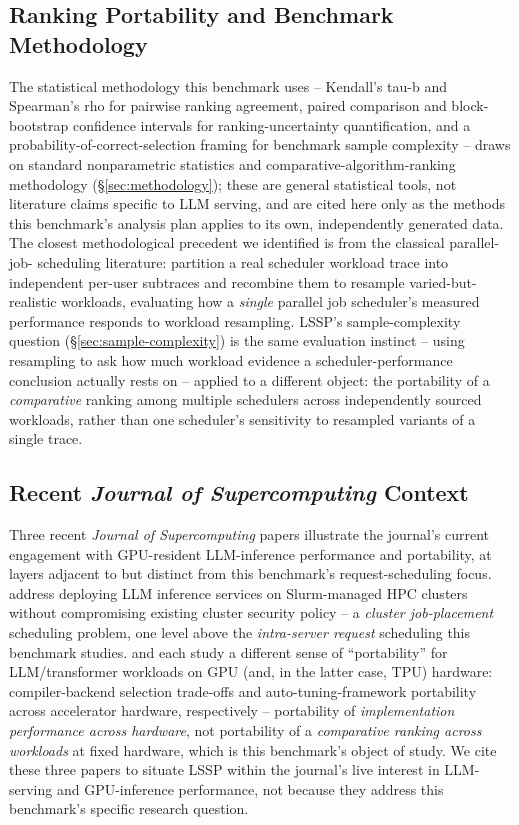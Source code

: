 \documentclass[sn-basic,Numbered,pdflatex]{sn-jnl}
\begin{document}
\subsection{Ranking Portability and Benchmark Methodology}
\label{sec:related-methodology}

The statistical methodology this benchmark uses -- Kendall's tau-b and
Spearman's rho for pairwise ranking agreement, paired comparison and
block-bootstrap confidence intervals for ranking-uncertainty
quantification, and a probability-of-correct-selection framing for
benchmark sample complexity -- draws on standard nonparametric statistics
and comparative-algorithm-ranking methodology (\S\ref{sec:methodology});
these are general statistical tools, not literature claims specific to LLM
serving, and are cited here only as the methods this benchmark's analysis
plan applies to its own, independently generated data. The closest
methodological precedent we identified is from the classical parallel-job-
scheduling literature: \citet{zakay2014resampling} partition a real
scheduler workload trace into independent per-user subtraces and recombine
them to resample varied-but-realistic workloads, evaluating how a
\emph{single} parallel job scheduler's measured performance responds to
workload resampling. LSSP's sample-complexity question
(\S\ref{sec:sample-complexity}) is the same evaluation instinct --
using resampling to ask how much workload evidence a scheduler-performance
conclusion actually rests on -- applied to a different object: the
portability of a \emph{comparative} ranking among multiple schedulers
across independently sourced workloads, rather than one scheduler's
sensitivity to resampled variants of a single trace.

\subsection{Recent \emph{Journal of Supercomputing} Context}
\label{sec:related-jsc}

Three recent \emph{Journal of Supercomputing} papers illustrate the
journal's current engagement with GPU-resident LLM-inference performance
and portability, at layers adjacent to but distinct from this benchmark's
request-scheduling focus. \citet{saia2026} address deploying LLM inference
services on Slurm-managed HPC clusters without compromising existing
cluster security policy -- a \emph{cluster job-placement} scheduling
problem, one level above the \emph{intra-server request} scheduling this
benchmark studies. \citet{carmona2026mlcompilers} and
\citet{siwinska2026autotuning} each study a different sense of
``portability'' for LLM/transformer workloads on GPU (and, in the latter
case, TPU) hardware: compiler-backend selection trade-offs and
auto-tuning-framework portability across accelerator hardware,
respectively -- portability of \emph{implementation performance across
hardware}, not portability of a \emph{comparative ranking across
workloads} at fixed hardware, which is this benchmark's object of study.
We cite these three papers to situate LSSP within the journal's live
interest in LLM-serving and GPU-inference performance, not because they
address this benchmark's specific research question.
\end{document}
